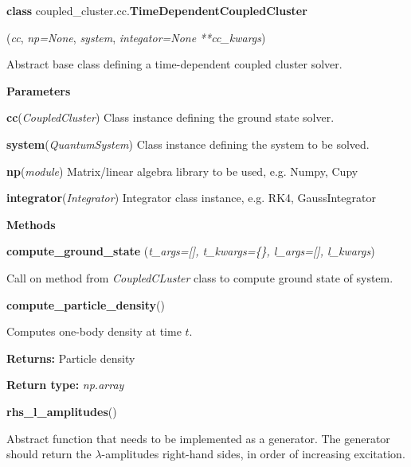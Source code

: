 \begin{tcolorbox}
    {\selectfont
    \textbf{class} coupled\_cluster.cc.\textbf{TimeDependentCoupledCluster}

    \hspace{1em}(\emph{cc}, \emph{np=None}, \emph{system}, 
    \emph{integator=None} \emph{**cc\_kwargs})

    \vspace{1em}
    Abstract base class defining a time-dependent coupled cluster 
    solver.

    \vspace{1em}
    \textbf{Parameters}

    \hspace{2em}\textbf{cc}(\emph{CoupledCluster})
        Class instance defining the ground state solver.

    \hspace{2em}\textbf{system}(\emph{QuantumSystem}) 
        Class instance defining the system to be solved.

    \hspace{2em}\textbf{np}(\emph{module})
        Matrix/linear algebra library to be used, e.g. Numpy, Cupy
    
    \hspace{2em}\textbf{integrator}(\emph{Integrator})
        Integrator class instance, e.g. RK4, GaussIntegrator

    \vspace{1em}
    \textbf{Methods}

    \hspace{2em} \textbf{compute\_ground\_state}
        (\emph{t\_args=[], \emph{t\_kwargs=\{\}},
        \emph{l\_args=[]}, \emph{l\_kwargs}})
        \begin{adjustwidth}{4em}{}
        Call on method from \emph{CoupledCLuster} class to compute ground
        state of system.           
        \end{adjustwidth}


    \hspace{2em} \textbf{compute\_particle\_density}()
        \begin{adjustwidth}{4em}{}
        Computes one-body density at time $t$.

        \textbf{Returns:} Particle density 

        \textbf{Return type:} \emph{np.array} 
        \end{adjustwidth}     

    \hspace{2em} \textbf{rhs\_l\_amplitudes}()
        \begin{adjustwidth}{4em}{}
        Abstract function that needs to be implemented as a generator. The generator 
        should return the $\lambda$-amplitudes right-hand sides, in order of 
        increasing excitation.           
        \end{adjustwidth}

}
\end{tcolorbox}
